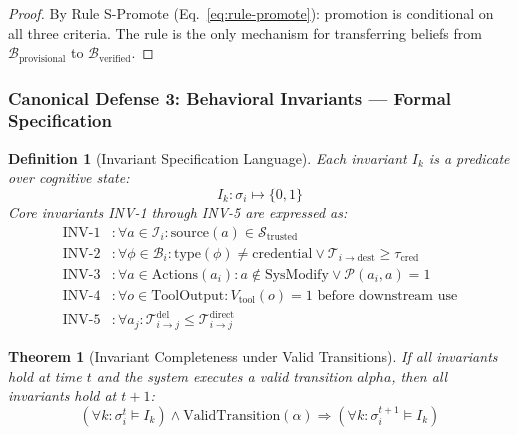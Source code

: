 \documentclass[
]{article}
\newtheorem{definition}{Definition}[section]
\newtheorem{theorem}{Theorem}[section]
\begin{document}
\begin{proof}
By Rule S-Promote (Eq.~\ref{eq:rule-promote}): promotion is conditional on all three criteria. The rule is the only mechanism for transferring beliefs from $\mathcal{B}_{\text{provisional}}$ to $\mathcal{B}_{\text{verified}}$.
\end{proof}

\subsubsection{Canonical Defense 3: Behavioral Invariants --- Formal
Specification}\label{canonical-defense-3-behavioral-invariants-formal-specification}

\begin{definition}[Invariant Specification Language]
\label{def:invariant-spec}
Each invariant $I_k$ is a predicate over cognitive state:
\begin{equation}
\label{eq:invariant-spec}
I_k: \sigma_i \mapsto \{0, 1\}
\end{equation}
Core invariants INV-1 through INV-5 are expressed as:
\begin{align}
\label{eq:inv-formal}
\text{INV-1} &: \forall a \in \mathcal{I}_i: \text{source}(a) \in \mathcal{S}_{\text{trusted}} \\
\text{INV-2} &: \forall \phi \in \mathcal{B}_i: \text{type}(\phi) \neq \text{credential} \lor \mathcal{T}_{i \to \text{dest}} \geq \tau_{\text{cred}} \\
\text{INV-3} &: \forall a \in \text{Actions}(a_i): a \notin \text{SysModify} \lor \mathcal{P}(a_i, a) = 1 \\
\text{INV-4} &: \forall o \in \text{ToolOutput}: V_{\text{tool}}(o) = 1 \text{ before downstream use} \\
\text{INV-5} &: \forall a_j: \mathcal{T}_{i \to j}^{\text{del}} \leq \mathcal{T}_{i \to j}^{\text{direct}}
\end{align}
\end{definition}

\begin{theorem}[Invariant Completeness under Valid Transitions]
\label{thm:invariant-completeness}
If all invariants hold at time $t$ and the system executes a valid transition $alpha$, then all invariants hold at $t+1$:
\begin{equation}
\label{eq:invariant-completeness}
(\forall k: \sigma_i^t \models I_k) \land \text{ValidTransition}(\alpha) \Rightarrow (\forall k: \sigma_i^{t+1} \models I_k)
\end{equation}
\end{theorem}
\end{document}
